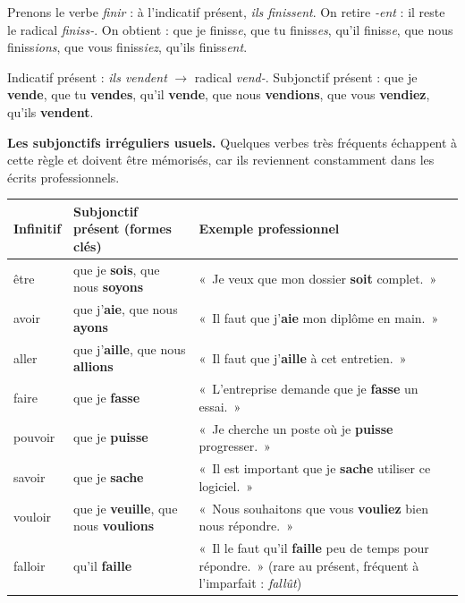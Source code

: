 \documentclass[11pt]{article}
\begin{document}
Prenons le verbe \emph{finir} : à l'indicatif présent, \emph{ils finissent}. On retire \emph{-ent} : il reste le radical \emph{finiss-}. On obtient : que je finiss\emph{e}, que tu finiss\emph{es}, qu'il finiss\emph{e}, que nous finiss\emph{ions}, que vous finiss\emph{iez}, qu'ils finiss\emph{ent}.

\begin{exemplebox}
Indicatif présent : \emph{ils vendent} $\rightarrow$ radical \emph{vend-}. Subjonctif présent : que je \textbf{vende}, que tu \textbf{vendes}, qu'il \textbf{vende}, que nous \textbf{vendions}, que vous \textbf{vendiez}, qu'ils \textbf{vendent}.
\end{exemplebox}

\textbf{Les subjonctifs irréguliers usuels.} Quelques verbes très fréquents échappent à cette règle et doivent être mémorisés, car ils reviennent constamment dans les écrits professionnels.

\begin{center}
\begin{tabularx}{\linewidth}{|l|X|X|}
\hline
\rowcolor{popblueL} \textbf{Infinitif} & \textbf{Subjonctif présent (formes clés)} & \textbf{Exemple professionnel} \\
\hline
être & que je \textbf{sois}, que nous \textbf{soyons} & «~Je veux que mon dossier \textbf{soit} complet.~» \\
\hline
avoir & que j'\textbf{aie}, que nous \textbf{ayons} & «~Il faut que j'\textbf{aie} mon diplôme en main.~» \\
\hline
aller & que j'\textbf{aille}, que nous \textbf{allions} & «~Il faut que j'\textbf{aille} à cet entretien.~» \\
\hline
faire & que je \textbf{fasse} & «~L'entreprise demande que je \textbf{fasse} un essai.~» \\
\hline
pouvoir & que je \textbf{puisse} & «~Je cherche un poste où je \textbf{puisse} progresser.~» \\
\hline
savoir & que je \textbf{sache} & «~Il est important que je \textbf{sache} utiliser ce logiciel.~» \\
\hline
vouloir & que je \textbf{veuille}, que nous \textbf{voulions} & «~Nous souhaitons que vous \textbf{vouliez} bien nous répondre.~» \\
\hline
falloir & qu'il \textbf{faille} & «~Il le faut qu'il \textbf{faille} peu de temps pour répondre.~» (rare au présent, fréquent à l'imparfait : \emph{fallût}) \\
\hline
\end{tabularx}
\end{center}
\end{document}
